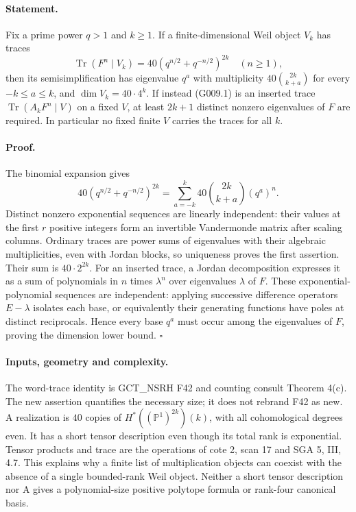 \paragraph{Statement.}
Fix a prime power $q>1$ and $k\ge1$. If a finite-dimensional
Weil object $V_k$ has traces
\[
 \operatorname{Tr}(F^n\mid V_k)=
 40(q^{n/2}+q^{-n/2})^{2k}\quad(n\ge1),
 \tag{G009.1}
\]
then its semisimplification has eigenvalue $q^a$ with multiplicity
$40\binom{2k}{k+a}$ for every $-k\le a\le k$, and
$\dim V_k=40\cdot4^k$. If instead (G009.1) is an inserted trace
$\operatorname{Tr}(A_kF^n\mid V)$ on a fixed $V$, at least
$2k+1$ distinct nonzero eigenvalues of $F$ are required. In
particular no fixed finite $V$ carries the traces for all $k$.

\paragraph{Proof.}
The binomial expansion gives
\[
 40(q^{n/2}+q^{-n/2})^{2k}
 =\sum_{a=-k}^k40\binom{2k}{k+a}(q^a)^n.
\]
Distinct nonzero exponential sequences are linearly independent:
their values at the first $r$ positive integers form an invertible
Vandermonde matrix after scaling columns. Ordinary traces are
power sums of eigenvalues with their algebraic multiplicities,
even with Jordan blocks, so uniqueness proves the first assertion.
Their sum is $40\cdot2^{2k}$. For an inserted trace, a Jordan
decomposition expresses it as a sum of polynomials in $n$ times
$\lambda^n$ over eigenvalues $\lambda$ of $F$. These
exponential-polynomial sequences are independent: applying
successive difference operators $E-\lambda$ isolates each
base, or equivalently their generating functions have poles at
distinct reciprocals. Hence every base $q^a$ must occur among
the eigenvalues of $F$, proving the dimension lower bound.
\hfill$\square$

\paragraph{Inputs, geometry and complexity.}
The word-trace identity is GCT\_NSRH F42 and counting consult
Theorem 4(c). The new assertion quantifies the necessary size;
it does not rebrand F42 as new. A realization is $40$ copies of
$H^*((\mathbb P^1)^{2k})(k)$, with all cohomological degrees even.
It has a short tensor description even though its total rank is
exponential. Tensor products and trace are the operations of
cote 2, scan 17 and SGA 5, III, 4.7. This explains why a finite
list of multiplication objects can coexist with the absence of
a single bounded-rank Weil object. Neither a short tensor
description nor A gives a polynomial-size positive polytope
formula or rank-four canonical basis.



